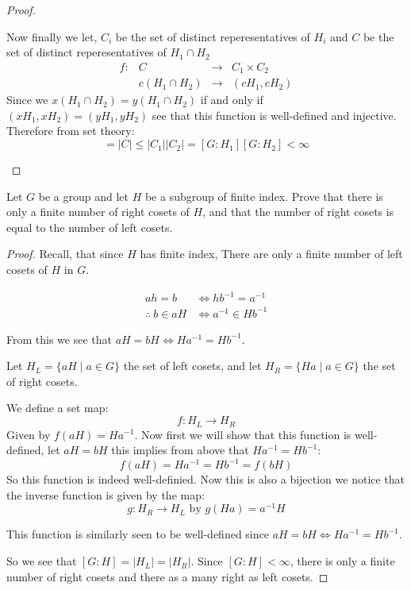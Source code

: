 \begin{exercise}
\begin{proof}
\begin{enumerate}[label = (\alph*)]
Now finally we let, $C_i$ be the set of distinct reperesentatives of $H_i$ and $C$ be the set of distinct reperesentatives of $H_1\cap H_2$ \[\begin{array}{cccc}
f\colon &C&\rightarrow& C_1\times C_2\\
&c(H_1\cap H_2)&\rightarrow& (cH_1,cH_2)
\end{array}\]
Since we $x(H_1\cap H_2) = y(H_1\cap H_2)$ if and only if $(xH_1,xH_2) = (yH_1,yH_2)$ see that this function is well-defined and injective. Therefore from set theory:\begin{equation*}
[G\colon H_1\cap H_2] = |C|\leq |C_1||C_2| = [G\colon H_1][G\colon H_2] < \infty
\end{equation*}

\end{enumerate}
\end{proof}
\end{exercise}

\begin{exercise}
Let $G$ be a group and let $H$ be a subgroup of finite index. Prove that there is only a finite number of right cosets of $H$, and that the number of right cosets is equal to the number of left cosets.
\begin{proof}
Recall, that since $H$ has finite index, There are only a finite number of left cosets of $H$ in $G$.

\begin{align*}
ah = b &\iff hb^{-1} = a^{-1}\\
\therefore \ b\in aH &\iff  a^{-1}\in Hb^{-1}
\end{align*}

From this we see that $aH = bH \iff Ha^{-1} = Hb^{-1}$. 

Let $H_L = \{aH\mid a\in G\}$ the set of left cosets, and let $H_R = \{Ha \mid a\in G\}$ the set of right cosets.

We define a set map:\[f\colon H_L\rightarrow H_R\] Given by $f(aH) = Ha^{-1}$. Now first we will show that this function is well-defined, let $aH = bH$ this implies from above that $Ha^{-1} = Hb^{-1}$:\begin{equation*}
f(aH) = Ha^{-1} = Hb^{-1} = f(bH)
\end{equation*} 
So this function is indeed well-definied. Now this is also a bijection we notice that the inverse function is given by the map:\[g\colon H_R\rightarrow H_L \text{ by }g(Ha) = a^{-1}H \]

This function is similarly seen to be well-defined since $aH = bH \iff Ha^{-1} = Hb^{-1}$. 

So we see that $[G\colon H] = |H_L| = |H_R|$. Since $[G\colon H]<\infty$, there is only a finite number of right cosets and there as a many right as left cosets.
\end{proof}
\end{exercise}

